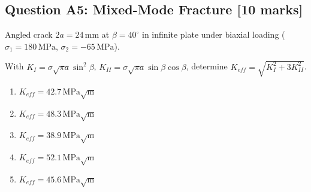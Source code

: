 \documentclass[12pt,a4paper]{article}
\begin{document}
\begin{questionbox}
\subsection*{Question A5: Mixed-Mode Fracture [10 marks]}
Angled crack $2a = 24\,\text{mm}$ at $\beta = 40^\circ$ in infinite plate under biaxial loading 
($\sigma_1 = 180\,\text{MPa}$, $\sigma_2 = -65\,\text{MPa}$).

\begin{center}
\end{center}

With $K_I = \sigma\sqrt{\pi a}\sin^2\beta$, $K_{II} = \sigma\sqrt{\pi a}\sin\beta\cos\beta$, 
determine $K_{eff} = \sqrt{K_I^2 + 3K_{II}^2}$.

\begin{mcqbox}
\begin{enumerate}[label=(\Alph*),leftmargin=*]
    \item $K_{eff} = 42.7\,\text{MPa}\sqrt{\text{m}}$
    \item $K_{eff} = 48.3\,\text{MPa}\sqrt{\text{m}}$
    \item $K_{eff} = 38.9\,\text{MPa}\sqrt{\text{m}}$
    \item $K_{eff} = 52.1\,\text{MPa}\sqrt{\text{m}}$
    \item $K_{eff} = 45.6\,\text{MPa}\sqrt{\text{m}}$
\end{enumerate}
\end{mcqbox}
\end{questionbox}
\end{document}
